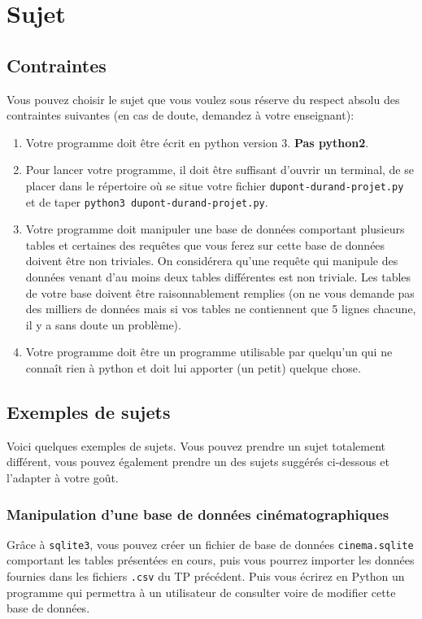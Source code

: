 \section{Sujet}

\subsection{Contraintes}
Vous pouvez choisir le sujet que vous voulez sous réserve du respect
absolu des contraintes suivantes (en cas de doute, demandez à votre
enseignant):

\begin{enumerate}
\item Votre programme doit être écrit en python version 3. \textbf{Pas
    python2}.
\item Pour lancer votre programme, il doit être suffisant d'ouvrir un
  terminal, de se placer dans le répertoire où se situe votre fichier
  \texttt{dupont-durand-projet.py} et de taper \texttt{python3
    dupont-durand-projet.py}.
\item Votre  programme doit manipuler  une base de  données comportant
  plusieurs tables et certaines des  requêtes que vous ferez sur cette
  base de  données doivent  être non triviales. On  considérera qu'une
  requête  qui manipule  des  données venant  d'au  moins deux  tables
  différentes est non triviale. Les tables de votre base doivent être
  raisonnablement remplies (on ne vous demande pas des milliers de
  données mais si vos tables ne contiennent que 5 lignes chacune, il
  y a sans doute un problème).
\item Votre programme doit être  un programme utilisable par quelqu'un
  qui ne connaît rien à python et doit lui apporter (un petit) quelque chose.
\end{enumerate}

\subsection{Exemples de sujets}

Voici quelques exemples de sujets. Vous pouvez prendre un sujet
totalement différent, vous pouvez également prendre un des sujets
suggérés ci-dessous et l'adapter à votre goût.

\subsubsection{Manipulation d'une base de données cinématographiques}
Grâce à \texttt{sqlite3}, vous pouvez créer un fichier de base de
données \texttt{cinema.sqlite} comportant les tables présentées en cours,
puis vous pourrez importer les données fournies dans les fichiers
\texttt{.csv} du TP précédent. Puis vous écrirez en Python un
programme qui permettra à un utilisateur de consulter voire de
modifier cette base de données.

